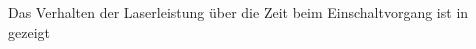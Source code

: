 \documentclass[../../../main.tex]{subfiles}
\begin{document}
    Das Verhalten der Laserleistung über die Zeit beim Einschaltvorgang ist in gezeigt


    
\end{document}
